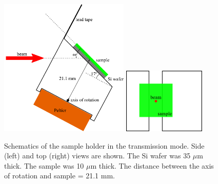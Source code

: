 \begin{figure}[htbp]
  \centering
  \includegraphics[width=0.55\textwidth]{figures/ripple/MMs/transmission/holder_side}
  \includegraphics[width=0.35\textwidth]{figures/ripple/MMs/transmission/holder_top}
  \caption[Schematics of the sample holder in the transmission mode]
  {Schematics of the sample holder in the transmission mode.
  Side (left) and top (right) views are shown. The Si wafer
  was 35 $\mu$m thick. The sample was 10 $\mu$m thick. The
  distance between the axis of rotation and sample = 21.1 mm.}
  \label{fig:holder_schematic}
\end{figure}

